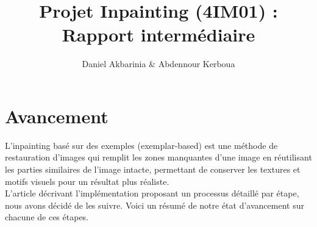 \documentclass[10pt]{article}
\title{\textbf{Projet Inpainting (4IM01) : Rapport intermédiaire}}
\author{Daniel Akbarinia \& Abdennour Kerboua}
\begin{document}
\maketitle

\section{Avancement}
L'inpainting basé sur des exemples (exemplar-based) est une méthode de restauration d'images qui remplit les zones manquantes d'une image en réutilisant les parties similaires de l'image intacte, permettant de conserver les textures et motifs visuels pour un résultat plus réaliste.
\\ L'article décrivant l'implémentation proposant un processus détaillé par étape, nous avons décidé de les suivre. Voici un résumé de notre état d'avancement sur chacune de ces étapes.
\end{document}

